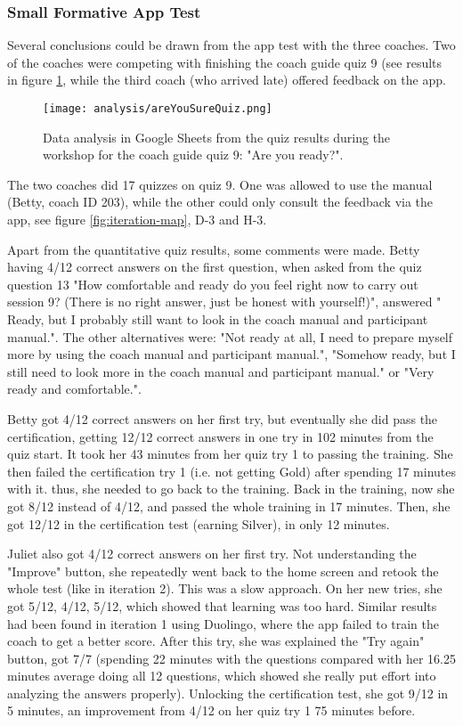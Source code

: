   \subsubsection{Small Formative App Test}

  Several conclusions could be drawn from the app test with the three coaches. Two of the coaches were competing with finishing the coach guide quiz 9 (see results in figure \ref{fig:areYouReady}, while the third coach (who arrived late) offered feedback on the app.

  \begin{figure}[h]
    \centering
    \texttt{[image: analysis/areYouSureQuiz.png]}
    \caption{Data analysis in Google Sheets from the quiz results during the workshop for the coach guide quiz 9: "Are you ready?".}
    \label{fig:areYouReady}
  \end{figure}

  The two coaches did 17 quizzes on quiz 9. One was allowed to use the manual (Betty, coach ID 203), while the other could only consult the feedback via the app, see figure \ref{fig:iteration-map}, D-3 and H-3.

  Apart from the quantitative quiz results, some comments were made. Betty having 4/12 correct answers on the first question, when asked from the quiz question 13 "How comfortable and ready do you feel right now to carry out session 9? (There is no right answer, just be honest with yourself!)", answered " Ready, but I probably still want to look in the coach manual and participant manual.". The other alternatives were: "Not ready at all, I need to prepare myself more by using the coach manual and participant manual.", "Somehow ready, but I still need to look more in the coach manual and participant manual." or "Very ready and comfortable.".

  Betty got 4/12 correct answers on her first try, but eventually she did pass the certification, getting 12/12 correct answers in one try in 102 minutes from the quiz start. It took her 43 minutes from her quiz try 1 to passing the training. She then failed the certification try 1 (i.e. not getting Gold) after spending 17 minutes with it. thus, she needed to go back to the training. Back in the training, now she got 8/12 instead of 4/12, and passed the whole training in 17 minutes. Then, she got 12/12 in the certification test (earning Silver), in only 12 minutes.

  Juliet also got 4/12 correct answers on her first try. Not understanding the "Improve" button, she repeatedly went back to the home screen and retook the whole test (like in iteration 2). This was a slow approach. On her new tries, she got 5/12, 4/12, 5/12, which showed that learning was too hard. Similar results had been found in iteration 1 using Duolingo, where the app failed to train the coach to get a better score. After this try, she was explained the "Try again" button, got 7/7 (spending 22 minutes with the questions compared with her 16.25 minutes average doing all 12 questions, which showed she really put effort into analyzing the answers properly). Unlocking the certification test, she got 9/12 in 5 minutes, an improvement from 4/12 on her quiz try 1 75 minutes before.

